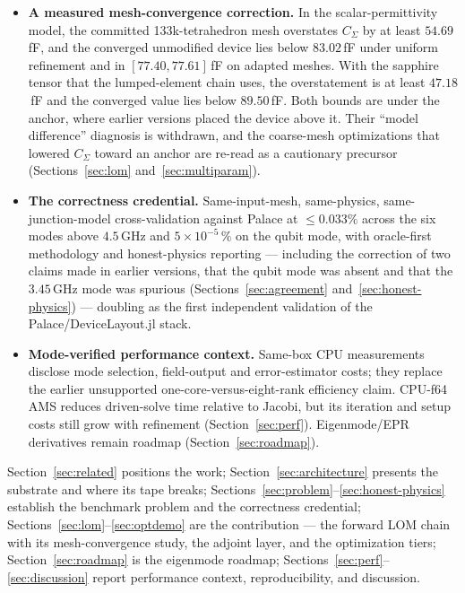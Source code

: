 \documentclass{anvil-paper}
\begin{document}
\begin{itemize}
    corrected in two measured steps --- the qubit--resonator coupling and
    a series loop inductance of the junction's current path --- from the
    dressed $93.954$\,fF to a bare-qubit $93.853$\,fF and a loop-corrected
    $93.143$\,fF. Both steps are extrapolations, not bounds, and rest on a
    stated transfer assumption. The certified brackets are narrower than
    the anchor's own uncertainty (Section~\ref{sec:anchor-chain}).
  \item \textbf{A measured mesh-convergence correction.} In the
    scalar-permittivity model, the committed 133k-tetrahedron mesh
    overstates $C_\Sigma$ by at least $54.69$\,fF, and the converged
    unmodified device lies below $83.02$\,fF under uniform refinement and
    in $[77.40, 77.61]$\,fF on adapted meshes. With the sapphire tensor
    that the lumped-element chain uses, the overstatement is at least
    $47.18$\,fF and the converged value lies below $89.50$\,fF. Both
    bounds are under the anchor, where earlier versions placed the device
    above it. Their ``model difference'' diagnosis is withdrawn,
    and the coarse-mesh optimizations that lowered $C_\Sigma$ toward an
    anchor are re-read as a cautionary precursor
    (Sections~\ref{sec:lom} and~\ref{sec:multiparam}).
  \item \textbf{The correctness credential.} Same-input-mesh,
    same-physics, same-junction-model cross-validation against Palace at
    $\leq 0.033\%$ across the six modes above $4.5$\,GHz and
    $5\times10^{-5}\,\%$ on the qubit mode, with oracle-first methodology
    and honest-physics reporting --- including the correction of two
    claims made in earlier versions, that the qubit mode was absent and
    that the $3.45$\,GHz mode was spurious
    (Sections~\ref{sec:agreement} and~\ref{sec:honest-physics}) ---
    doubling as the first independent validation of the
    Palace/DeviceLayout.jl stack.
  \item \textbf{Mode-verified performance context.} Same-box CPU
    measurements disclose mode selection, field-output and error-estimator
    costs; they replace the earlier unsupported one-core-versus-eight-rank
    efficiency claim. CPU-f64 AMS reduces driven-solve time relative to
    Jacobi, but its iteration and setup costs still grow with refinement
    (Section~\ref{sec:perf}). Eigenmode/EPR derivatives remain roadmap
    (Section~\ref{sec:roadmap}).
\end{itemize}

Section~\ref{sec:related} positions the work; Section~\ref{sec:architecture}
presents the substrate and where its tape breaks;
Sections~\ref{sec:problem}--\ref{sec:honest-physics} establish the
benchmark problem and the correctness credential;
Sections~\ref{sec:lom}--\ref{sec:optdemo} are the contribution ---
the forward LOM chain with its mesh-convergence study, the adjoint
layer, and the optimization tiers; Section~\ref{sec:roadmap} is the eigenmode roadmap;
Sections~\ref{sec:perf}--\ref{sec:discussion} report performance context,
reproducibility, and discussion.
\end{document}
